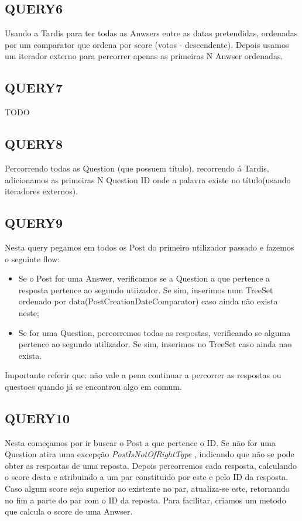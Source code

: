 \documentclass[letterpaper, 10 pt, conference]{IEEEtran} %
\begin{document}
\subsection{QUERY6}

Usando a Tardis para ter todas as Anwsers entre as datas pretendidas, ordenadas por um comparator 
que ordena por score (votos - descendente). Depois usamos um iterador externo para percorrer apenas as primeiras N Anwser ordenadas.

\subsection{QUERY7}

TODO

\subsection{QUERY8}

Percorrendo todas as Question (que possuem título), recorrendo á Tardis, adicionamos as primeiras N Question ID onde a palavra
existe no título(usando iteradores externos).

\subsection{QUERY9}

Nesta query pegamos em todos os Post do primeiro utilizador passado e fazemos o seguinte flow:
\begin{itemize}
    \item Se o Post for uma Answer, verificamos se a Question a que pertence a resposta pertence ao segundo utiizador. Se sim,
    inserimos num TreeSet ordenado por data(PostCreationDateComparator) caso ainda não exista neste;
    \item Se for uma Question, percorremos todas as respostas, verificando se alguma pertence ao segundo utilizador. Se sim, inserimos
    no TreeSet caso ainda nao exista.
\end{itemize}
    Importante referir que: não vale a pena continuar a percorrer as respostas ou questoes quando já se encontrou algo em comum.


\subsection{QUERY10}

Nesta começamos por ir buscar o Post a que pertence o ID. Se não for uma Question atira uma excepção \textit{PostIsNotOfRightType}
, indicando que não se pode obter as respostas de uma reposta.
Depois percorremos cada resposta, calculando o score desta e atribuindo a um par constituido por este e pelo ID da resposta.
Caso algum score seja superior ao existente no par, atualiza-se este, retornando no fim a parte do par com o ID da reposta.
Para facilitar, criamos um metodo que calcula o score de uma Anwser.
\end{document}
